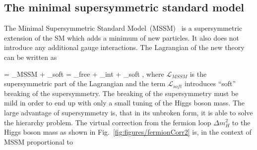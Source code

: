 

\subsection{The minimal supersymmetric standard model}

The Minimal Supersymmetric Standard Model~(MSSM)~\cite{Martin:1997ns} is a supersymmetric extension of the SM which adds a minimum of new particles. It also does not introduce any additional gauge interactions. The Lagrangian of the new theory can be written as

{
     =  _{MSSM} +  _{soft} = _{free} + _{int} + _{soft}    ,
}
where $\mathcal{L}_{MSSM}$ is the supersymmetric part of the Lagrangian and the term $\mathcal{L}_{soft}$ introduces ``soft'' breaking of the supersymmetry. The breaking of the supersymmetry must be mild in order to end up with only a small tuning of the Higgs boson mass. The large advantage of supersymmetry is, that in its unbroken form, it is able to solve the hierarchy problem. The virtual correction from the fermion loop $\Delta m_{H}^{2}$ to the Higgs boson mass as shown in Fig.~\ref{fig:figures/fermionCorr2} is,  in the context of MSSM proportional to

